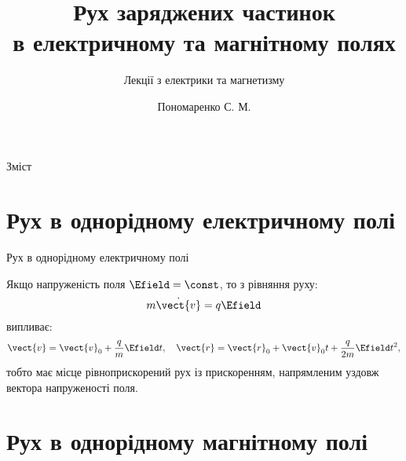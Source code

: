 \documentclass[onlytextwidth]{beamer}
\title[Лекції електрики та магнетизму]{\huge\bfseries Рух заряджених частинок\\ в електричному та магнітному полях}
\subtitle{Лекції з електрики та магнетизму}
\author{Пономаренко С. М.}
\date{}
\begin{document}
\begin{frame}[plain]
	\maketitle
\end{frame}

\begin{frame}{Зміст}{}
	\tableofcontents
\end{frame}


\section{Рух в однорідному електричному полі}

\begin{frame}{Рух в однорідному електричному полі}{}
	\begin{block}{}\justifying
		Якщо напруженість поля $\Efield=\const$, то з рівняння руху:
		\begin{equation*}
			m\dot{\vect{v}} = q\Efield
		\end{equation*}
		випливає:
		\begin{equation*}
			\vect{v} = \vect{v}_0 + \frac{q}{m}\Efield t,\quad \vect{r} = \vect{r}_0 + \vect{v}_0t +   \frac{q}{2m}\Efield t^2,
		\end{equation*}
		тобто має місце рівноприскорений рух із прискоренням, напрямленим уздовж вектора напруженості поля.
	\end{block}
\end{frame}


\section{Рух в однорідному магнітному полі}
\end{document}

